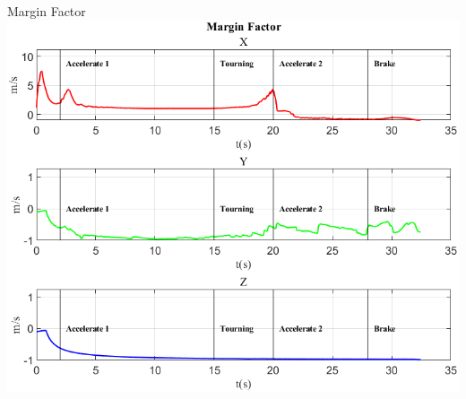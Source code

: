 \documentclass[beamer]{standalone}
\begin{document}
	\begin{frame}{{Margin Factor}}
		\centering\includegraphics[height=.8\textheight]{figure/Vel/Margin Factor}
	\end{frame}
	
\end{document}
